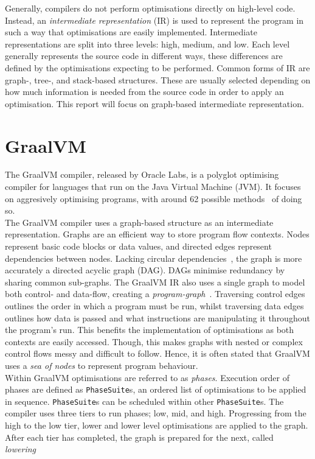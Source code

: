 \documentclass[12pt,openany,a4paper]{book}
\begin{document}
Generally, compilers do not perform optimisations directly on high-level code.
Instead, an \emph{intermediate representation} (IR) is used to represent the
program in such a way that optimisations are easily implemented. Intermediate
representations are split into three levels: high, medium, and low. Each
level generally represents the source code in different ways, these differences
are defined by the optimisations expecting to be performed.
Common forms of IR are graph-, tree-, and stack-based structures. These are
usually selected depending on how much information is needed from the source
code in order to apply an optimisation.
This report will focus on graph-based intermediate representation.

\section{GraalVM}
\label{graal}

The GraalVM compiler, released by Oracle Labs, is a polyglot optimising compiler
for languages that run on the Java Virtual Machine (JVM). It focuses on aggresively
optimising programs, with around 62 possible methods~\cite{graalenterprise} of doing so.\\
The GraalVM compiler uses a graph-based structure as an intermediate
representation. Graphs are an efficient way to store program flow contexts. Nodes represent
basic code blocks or data values, and directed edges represent dependencies 
between nodes. Lacking circular dependencies~\cite{gir}, the graph is more accurately a
directed acyclic graph (DAG). DAGs minimise redundancy by sharing common sub-graphs.
The GraalVM IR also uses a single graph to model both control- and data-flow, 
creating a \emph{program-graph}~\cite{understanding}. Traversing control edges outlines the order in which
a program must be run, whilst traversing data edges outlines how data is
passed and what instructions are manipulating it throughout the program's run.
This benefits the implementation of optimisations as both contexts are easily
accessed. Though, this makes graphs with nested or complex control flows messy
and difficult to follow. Hence, it is often stated that GraalVM uses a
\emph{sea of nodes} to represent program behaviour.\\
Within GraalVM optimisations are referred to as \emph{phases}. Execution order of
phases are defined as \verb|PhaseSuite|s, an ordered list of optimisations to be
applied in sequence. \verb|PhaseSuite|s can be scheduled within other \verb|PhaseSuite|s.
The compiler uses three tiers to run phases; low, mid, and high. Progressing from
the high to the low tier, lower and lower level optimisations are applied to the
graph. After each tier has completed, the graph is prepared for the next, called
\emph{lowering}~\cite{poly-graal}
\end{document}
